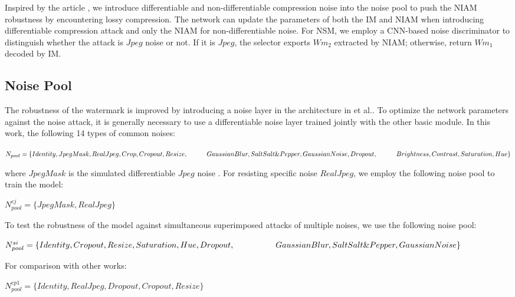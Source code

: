 \documentclass[sigconf]{acmart}
\begin{document}
Inspired by the article \cite{jia2021mbrs}, we introduce differentiable and non-differentiable compression noise into the noise pool to push the NIAM robustness by encountering lossy compression. The network can update the parameters of both the IM and NIAM when introducing differentiable compression attack and only the NIAM for non-differentiable noise.
For NSM, we employ a CNN-based noise discriminator to distinguish whether the attack is $Jpeg$ noise or not. If it is $Jpeg$, the selector exports $Wm_{2}$ extracted by NIAM; otherwise, return $Wm_{1}$ decoded by IM.






\subsection{Noise Pool}
The robustness of the watermark is improved by introducing a noise layer in the architecture in \cite{luo2020distortion,liu2019novel,zhu2018hidden} et al.. To optimize the network parameters against the noise attack, it is generally necessary to use a differentiable noise layer trained jointly with the other basic module. In this work, the following 14 types of common noises:

$
    N_{pool} = \{Identity, JpegMask, RealJpeg, Crop, Cropout, Resize, \\
    \hspace*{3em} GaussianBlur, SaltSalt\&Pepper, GaussianNoise, Dropout,\\
    \hspace*{3em} 
    Brightness, Contrast, Saturation, Hue\}
$

where $JpegMask$ is the simulated differentiable $Jpeg$ noise \cite{jia2021mbrs}. For resisting specific noise $RealJpeg$, we employ the following noise pool to train the model:

$
    N^{{cj}}_{pool} = \{JpegMask, RealJpeg\}
$

To test the robustness of the model against simultaneous superimposed attacks of multiple noises, we use the following noise pool:

$
    N^{si}_{pool} = \{Identity, Cropout, Resize, Saturation, Hue, Dropout,\\
    \hspace*{5em} GaussianBlur, SaltSalt\&Pepper, GaussianNoise\}
$

For comparison with other works:

$
    N^{cp1}_{pool} = \{Identity, RealJpeg, Dropout, Cropout, Resize\}
$
\end{document}
